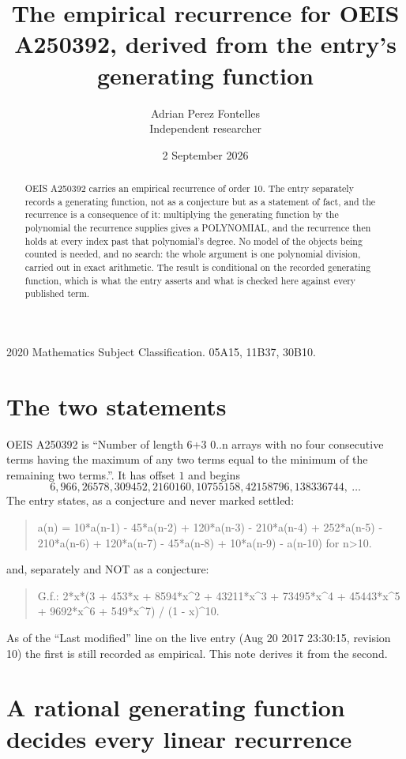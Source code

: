\documentclass[11pt,a4paper]{article}
\title{The empirical recurrence for OEIS A250392, derived from the entry's generating function}
\author{Adrian Perez Fontelles\\ \small Independent researcher}
\date{2 September 2026}
\theoremstyle{plain}
\theoremstyle{definition}
\begin{document}
\maketitle

\begin{abstract}
OEIS A250392 carries an empirical recurrence of order $10$. The entry separately records a
generating function, not as a conjecture but as a statement of fact, and the recurrence is a
consequence of it: multiplying the generating function by the polynomial the recurrence
supplies gives a POLYNOMIAL, and the recurrence then holds at every index past that
polynomial's degree. No model of the objects being counted is needed, and no search: the
whole argument is one polynomial division, carried out in exact arithmetic. The result is
conditional on the recorded generating function, which is what the entry asserts and what is
checked here against every published term.
\end{abstract}

\noindent\small 2020 Mathematics Subject Classification. 05A15, 11B37, 30B10.\normalsize

\section{The two statements}

OEIS A250392 is ``Number of length 6+3 0..n arrays with no four consecutive terms having the maximum of any two terms equal to the minimum of the remaining two terms.''. It has offset $1$ and begins
\[
6, 966, 26578, 309452, 2160160, 10755158, 42158796, 138336744,\ \dots
\]
The entry states, as a conjecture and never marked settled:
\begin{quote}
a(n) = 10*a(n-1) - 45*a(n-2) + 120*a(n-3) - 210*a(n-4) + 252*a(n-5) - 210*a(n-6) + 120*a(n-7) - 45*a(n-8) + 10*a(n-9) - a(n-10) for n>10.
\end{quote}
and, separately and NOT as a conjecture:
\begin{quote}
G.f.: 2*x*(3 + 453*x + 8594*x\^{}2 + 43211*x\^{}3 + 73495*x\^{}4 + 45443*x\^{}5 + 9692*x\^{}6 + 549*x\^{}7) / (1 - x)\^{}10.
\end{quote}
As of the ``Last modified'' line on the live entry (Aug 20 2017 23:30:15, revision 10) the first is still
recorded as empirical. This note derives it from the second.

\section{A rational generating function decides every linear recurrence}
\end{document}
